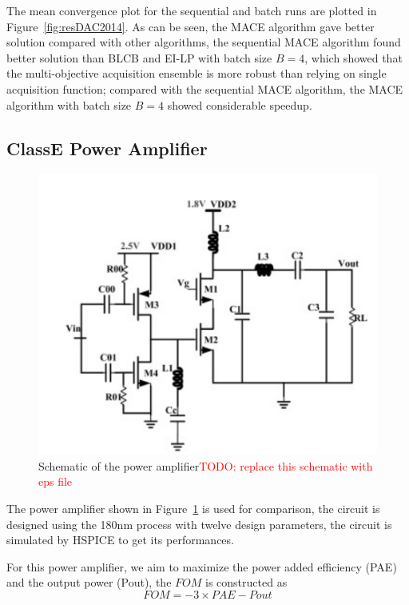 The mean convergence plot for the sequential and batch runs are plotted in
Figure~\ref{fig:resDAC2014}. As can be seen, the MACE algorithm gave better
solution compared with other algorithms, the sequential MACE algorithm found
better solution than BLCB and EI-LP with batch size $B = 4$, which showed that
the multi-objective acquisition ensemble is more robust than relying on single
acquisition function; compared with the sequential MACE algorithm, the MACE
algorithm with batch size $B = 4$ showed considerable speedup.


\subsection{ClassE Power Amplifier}


\begin{figure}[htbp]
    \begin{center}
        \centerline{\includegraphics[width=\columnwidth]{./img/classE.png}}
        \caption{Schematic of the power amplifier\textcolor{red}{TODO: replace this schematic with eps file} }
        \label{fig:schPA}
    \end{center}
\end{figure}

The power amplifier shown in Figure~\ref{fig:schPA} is used for comparison, the
circuit is designed using the 180nm process with twelve design parameters, the
circuit is simulated by HSPICE to get its performances.

For this power amplifier, we aim to maximize the power added efficiency (PAE) and the output power (Pout), the $FOM$ is constructed as
$$
\mathit{FOM} = -3 \times \mathit{PAE} - \mathit{Pout}
$$

